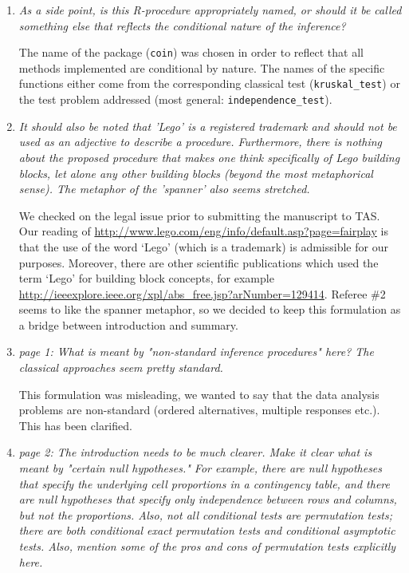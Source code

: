 \documentclass[11pt]{article}
\begin{document}
\begin{enumerate}
\item \textsl{As a side point, is this R-procedure appropriately named, or should it be called 
              something else that reflects the conditional nature of the inference?}

The name of the package (\texttt{coin}) was chosen in order to reflect that
all methods implemented are conditional by nature. The names of the specific
functions either come from the corresponding classical test
(\texttt{kruskal\_test}) or the test problem addressed (most general:
\texttt{independence\_test}).

\item \textsl{It should also be noted that 'Lego' is a registered trademark and should not be used 
              as an adjective to describe a procedure. Furthermore, there is nothing about the 
              proposed procedure that makes one think specifically of Lego building blocks, 
              let alone any other building blocks (beyond the most metaphorical sense). The 
              metaphor of the 'spanner' also seems stretched.}

We checked on the legal issue prior to submitting the manuscript to TAS. Our
reading of \url{http://www.lego.com/eng/info/default.asp?page=fairplay} is
that the use of the word `Lego' (which is a trademark) is admissible for our
purposes. Moreover, there are other scientific publications which used the
term `Lego' for building block concepts, for example
\url{http://ieeexplore.ieee.org/xpl/abs_free.jsp?arNumber=129414}.
Referee \#2 seems to like the spanner
metaphor, so we decided to keep this formulation as a bridge between
introduction and summary.


\item \textsl{page 1:  What is meant by "non-standard inference procedures" here? The classical 
              approaches seem pretty standard.}

This formulation was misleading, we wanted to say that the data analysis
problems are non-standard (ordered alternatives, multiple responses etc.).
This has been clarified.

\item \textsl{page 2:  The introduction needs to be much clearer. Make it clear what is meant by 
              "certain null hypotheses." For example, there are null hypotheses that specify the 
              underlying cell proportions in a contingency table, and there are null hypotheses 
              that specify only independence between rows and columns, but not the proportions. 
              Also, not all conditional tests are permutation tests; there are both conditional 
              exact permutation tests and conditional asymptotic tests. Also, mention some of 
              the pros and cons of permutation tests explicitly here.}


\end{enumerate}
\end{document}
